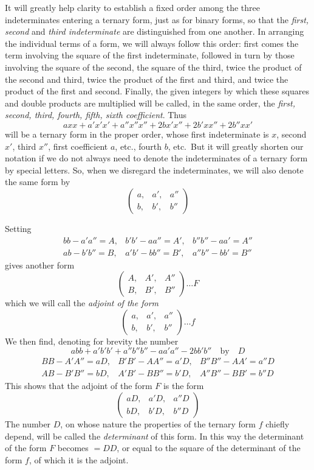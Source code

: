 It will greatly help clarity to establish a fixed order among the three indeterminates entering a ternary form, just as for binary forms, so that the \textit{first, second} and \textit{third indeterminate} are distinguished from one another. In arranging the individual terms of a form, we will always follow this order: first comes the term involving the square of the first indeterminate, followed in turn by those involving the square of the second, the square of the third, twice the product of the second and third, twice the product of the first and third, and twice the product of the first and second. Finally, the given integers by which these squares and double products are multiplied will be called, in the same order, the \textit{first, second, third, fourth, fifth, sixth coefficient}. Thus
\[
axx+a'x'x'+a''x''x''+2bx'x''+2b'xx''+2b''xx'
\]
will be a ternary form in the proper order, whose first indeterminate is $x$, second $x'$, third $x''$, first coefficient $a$, etc., fourth $b$, etc.\ But it will greatly shorten our notation if we do not always need to denote the indeterminates of a ternary form by special letters. So, when we disregard the indeterminates, we will also denote the same form by
\[
\begin{pmatrix}
a, & a', & a'' \\
b, & b', & b''
\end{pmatrix}
\]

Setting
\[
\begin{array}{lll}
bb-a'a''=A, & b'b'-aa''=A', & b''b''-aa'=A'' \\
ab-b'b''=B, & a'b'-bb''=B', & a''b''-bb'=B''
\end{array}
\]
gives another form
\[
\begin{pmatrix}
A, & A', & A'' \\
B, & B', & B''
\end{pmatrix}\ldots F
\]
which we will call the \textit{adjoint of the form}
\[
\begin{pmatrix}
a, & a', & a'' \\
b, & b', & b''
\end{pmatrix}\ldots f
\]
We then find, denoting for brevity the number
\[
abb+a'b'b'+a''b''b''-aa'a''-2bb'b''\quad\text{by}\quad D
\]
\[
\begin{array}{lll}
BB-A'A''=aD, & B'B'-AA''=a'D, & B''B''-AA'=a''D \\
AB-B'B''=bD, & A'B'-BB''=b'D, & A''B''-BB'=b''D
\end{array}
\]
This shows that the adjoint of the form $F$ is the form
\[
\begin{pmatrix}
aD, & a'D, & a''D \\
bD, & b'D, & b''D
\end{pmatrix}
\]
The number $D$, on whose nature the properties of the ternary form $f$ chiefly depend, will be called the \textit{determinant} of this form. In this way the determinant of the form $F$ becomes $=DD$, or equal to the square of the determinant of the form $f$, of which it is the adjoint.

